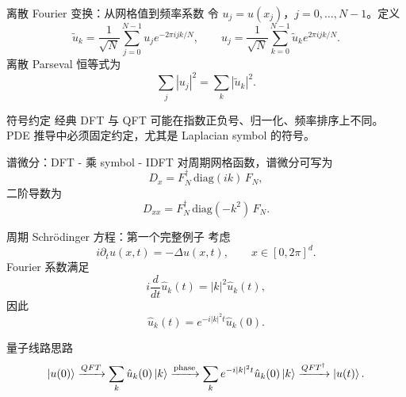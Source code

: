 \documentclass[aspectratio=169,10pt]{ctexbeamer}
\begin{document}
\begin{frame}{离散 Fourier 变换：从网格值到频率系数}
令 $u_j=u(x_j)$，$j=0,\ldots,N-1$。定义
\[
\tilde u_k=\frac1{\sqrt N}\sum_{j=0}^{N-1}u_j e^{-2\pi ijk/N},
\qquad
u_j=\frac1{\sqrt N}\sum_{k=0}^{N-1}\tilde u_k e^{2\pi ijk/N}.
\]
离散 Parseval 恒等式为
\[
\sum_j |u_j|^2=\sum_k |\tilde u_k|^2.
\]
\begin{warnbox}{符号约定}
经典 DFT 与 QFT 可能在指数正负号、归一化、频率排序上不同。PDE 推导中必须固定约定，尤其是 Laplacian symbol 的符号。
\end{warnbox}
\end{frame}

\begin{frame}{谱微分：DFT - 乘 symbol - IDFT}
对周期网格函数，谱微分可写为
\[
D_x = F_N^{\dagger}\,\mathrm{diag}(ik)\,F_N,
\]
二阶导数为
\[
D_{xx}=F_N^{\dagger}\,\mathrm{diag}(-k^2)\,F_N.
\]
\begin{center}
\end{center}
\end{frame}

\begin{frame}{周期 Schr\"odinger 方程：第一个完整例子}
考虑
\[
i\partial_t u(x,t)=-\Delta u(x,t),
\qquad x\in[0,2\pi]^d.
\]
Fourier 系数满足
\[
i\frac{d}{dt}\hat u_k(t)=|k|^2\hat u_k(t),
\]
因此
\[
\hat u_k(t)=e^{-i|k|^2t}\hat u_k(0).
\]
\begin{keybox}{量子线路思路}
\[
\ket{u(0)}\xrightarrow{QFT}\sum_k \hat u_k(0)\ket k
\xrightarrow{\mathrm{phase}}\sum_k e^{-i|k|^2t}\hat u_k(0)\ket k
\xrightarrow{QFT^{\dagger}}\ket{u(t)}.
\]
\end{keybox}
\end{frame}
\end{document}
